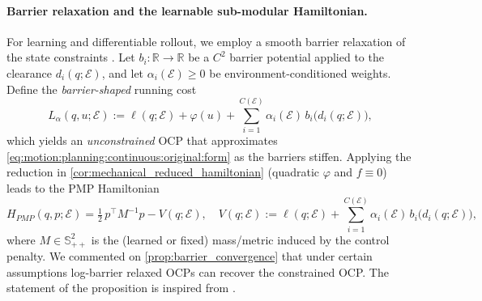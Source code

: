 \documentclass{article} %
\begin{document}
\paragraph{Barrier relaxation and the learnable {sub-modular} Hamiltonian.}
For learning and differentiable rollout, we employ a smooth barrier relaxation of the state constraints \citep{NocedalWright2006NumericalOptimization}.
Let $b_i:\mathbb R\to\mathbb R$ be a $C^2$ barrier potential applied to the clearance $d_i(q;\mathcal E)$, and let
$\alpha_i(\mathcal E)\ge 0$ be environment-conditioned weights.
Define the \emph{barrier-shaped} running cost
\begin{equation}
\label{eq:barrier_shaped_cost}
L_{\alpha}(q,u;\mathcal E)
:=\ell(q;\mathcal E)+\varphi(u)+\sum_{i=1}^{C(\mathcal E)} \alpha_i(\mathcal E)\, b_i\!\big(d_i(q;\mathcal E)\big),
\end{equation}
which yields an \emph{unconstrained} OCP that approximates \cref{eq:motion:planning:continuous:original:form} as the barriers stiffen.
Applying the reduction in \cref{cor:mechanical_reduced_hamiltonian} (quadratic $\varphi$ and $f\equiv 0$)
leads to the PMP Hamiltonian
\begin{equation}
\label{eq:def:pmp:hamiltonian:grl-snam}
H_{PMP}(q,p;\mathcal E)
=\tfrac12\,p^\top M^{-1}p- V(q;\mathcal E),
\quad
V(q;\mathcal E)
:= \ell(q;\mathcal E)+\sum_{i=1}^{C(\mathcal E)} \alpha_i(\mathcal E)\, b_i\!\big(d_i(q;\mathcal E)\big),
\end{equation}
where $M\in\mathbb S_{++}^2$ is the (learned or fixed) mass/metric induced by the control penalty. We commented on \cref{prop:barrier_convergence} that under certain assumptions log-barrier relaxed OCPs can recover the constrained OCP. The statement of the proposition is inspired from \citet{malisani2023interior}.
\end{document}
